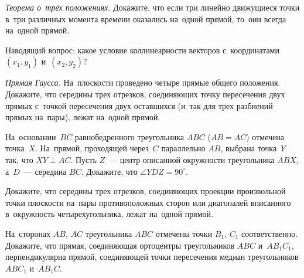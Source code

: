 


\begin{problems}

\item\emph{Теорема о~трёх положениях.}
Докажите, что если три линейно движущиеся точки в~три различных момента времени
оказались на~одной прямой, то~они всегда на~одной прямой.
\begin{em}
Наводящий вопрос: какое условие коллинеарности векторов с~координатами
$(x_1, y_1)$ и~$(x_2, y_2)$?
\end{em}

\item\emph{Прямая Гаусса.}
На~плоскости проведено четыре прямые общего положения.
Докажите, что середины трех отрезков, соединяющих точку пересечения двух прямых
с~точкой пересечения двух оставшихся (и~так для трех разбиений прямых на~пары),
лежат на~одной прямой.

\item
На~основании~$BC$ равнобедренного треугольника $ABC$ ($AB = AC$) отмечена
точка~$X$.
На~прямой, проходящей через~$C$ параллельно $AB$, выбрана точка~$Y$ так, что
$XY \perp AC$.
Пусть $Z$~--- центр описанной окружности треугольника $ABX$, а~$D$~---
середина $BC$.
Докажите, что $\angle YDZ = 90^{\circ}$.

\item
Докажите, что середины трех отрезков, соединяющих проекции произвольной точки
плоскости на~пары противоположных сторон или диагоналей вписанного в~окружность
четырехугольника, лежат на~одной прямой.


\item
На~сторонах $AB$, $AC$ треугольника $ABC$ отмечены точки $B_1$, $C_1$
соответственно.
Докажите, что прямая, соединяющая ортоцентры
треугольников $ABC$ и~$AB_{1}C_{1}$, перпендикулярна прямой, соединяющей точки
пересечения медиан треугольников $ABC_{1}$ и~$AB_{1}C$.


\end{problems}
